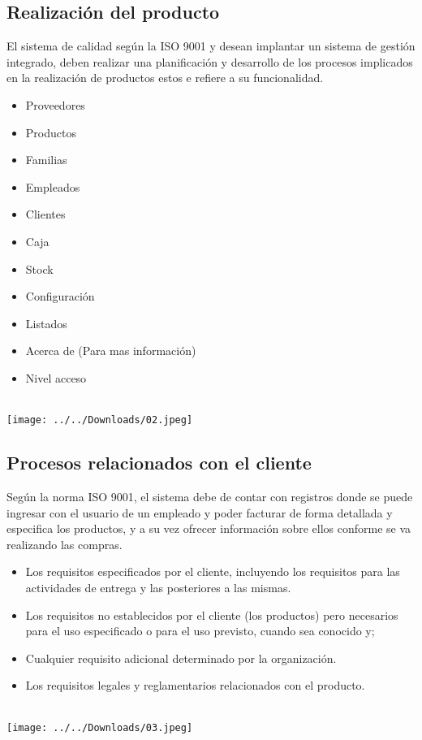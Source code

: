 \documentclass[12pt,a4paper]{article}
\begin{document}
\subsection{Realización del producto}
El sistema de calidad según la ISO 9001 y desean implantar un sistema de gestión integrado, deben realizar una planificación y desarrollo de los procesos implicados en la realización de productos estos e refiere a su funcionalidad.
\begin{itemize}
\item Proveedores
\item Productos
\item Familias
\item Empleados
\item Clientes
\item Caja
\item Stock
\item Configuración
\item Listados
\item Acerca de (Para mas información)
\item Nivel acceso\\\\
\end{itemize}
\begin{center}
\texttt{[image: ../../Downloads/02.jpeg]} 
\end{center}

\subsection{Procesos relacionados con el cliente}
Según la norma ISO 9001, el sistema debe de contar con registros donde se puede ingresar con el usuario de un empleado y poder facturar de forma detallada y especifica los productos, y a su vez ofrecer información sobre ellos conforme se va realizando las compras.
\begin{itemize}
\item Los requisitos especificados por el cliente, incluyendo los requisitos para las actividades de entrega y las posteriores a las mismas.
\item Los requisitos no establecidos por el cliente (los productos) pero necesarios para el uso especificado o para el uso previsto, cuando sea conocido y;
\item Cualquier requisito adicional determinado por la organización.
\item Los requisitos legales y reglamentarios relacionados con el producto.\\\\
\end{itemize}
\begin{center}
\texttt{[image: ../../Downloads/03.jpeg]}  
\end{center}
\end{document}
